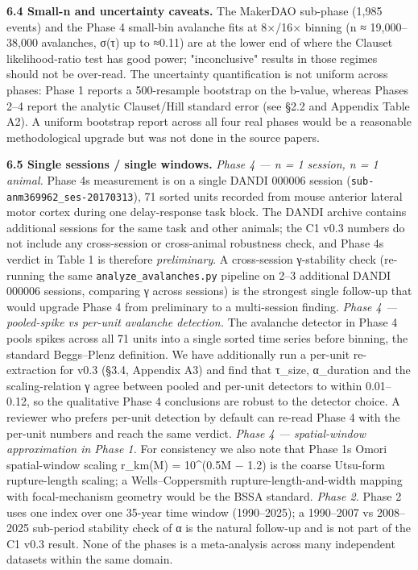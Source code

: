 \documentclass[
  11pt]{article}
\begin{document}
\textbf{6.4 Small-n and uncertainty caveats.} The MakerDAO sub-phase
(1,985 events) and the Phase 4 small-bin avalanche fits at 8×/16×
binning (n ≈ 19,000--38,000 avalanches, σ(τ) up to ≈0.11) are at the
lower end of where the Clauset likelihood-ratio test has good power;
"inconclusive" results in those regimes should not be over-read. The
uncertainty quantification is not uniform across phases: Phase 1 reports
a 500-resample bootstrap on the b-value, whereas Phases 2--4 report the
analytic Clauset/Hill standard error (see §2.2 and Appendix Table A2). A
uniform bootstrap report across all four real phases would be a
reasonable methodological upgrade but was not done in the source papers.

\textbf{6.5 Single sessions / single windows.} \emph{Phase 4 --- n = 1
session, n = 1 animal.} Phase 4\textquotesingle s measurement is on a
single DANDI 000006 session (\texttt{sub-anm369962\_ses-20170313}), 71
sorted units recorded from mouse anterior lateral motor cortex during
one delay-response task block. The DANDI archive contains additional
sessions for the same task and other animals; the C1 v0.3 numbers do not
include any cross-session or cross-animal robustness check, and Phase
4\textquotesingle s verdict in Table 1 is therefore \emph{preliminary}.
A cross-session γ-stability check (re-running the same
\texttt{analyze\_avalanches.py} pipeline on 2--3 additional DANDI 000006
sessions, comparing γ across sessions) is the strongest single follow-up
that would upgrade Phase 4 from preliminary to a multi-session finding.
\emph{Phase 4 --- pooled-spike vs per-unit avalanche detection.} The
avalanche detector in Phase 4 pools spikes across all 71 units into a
single sorted time series before binning, the standard Beggs--Plenz
definition. We have additionally run a per-unit re-extraction for v0.3
(§3.4, Appendix A3) and find that τ\_size, α\_duration and the
scaling-relation γ agree between pooled and per-unit detectors to within
0.01--0.12, so the qualitative Phase 4 conclusions are robust to the
detector choice. A reviewer who prefers per-unit detection by default
can re-read Phase 4 with the per-unit numbers and reach the same
verdict. \emph{Phase 4 --- spatial-window approximation in Phase 1.} For
consistency we also note that Phase 1\textquotesingle s Omori
spatial-window scaling r\_km(M) = 10\^{}(0.5M − 1.2) is the coarse
Utsu-form rupture-length scaling; a Wells--Coppersmith
rupture-length-and-width mapping with focal-mechanism geometry would be
the BSSA standard. \emph{Phase 2.} Phase 2 uses one index over one
35-year time window (1990--2025); a 1990--2007 vs 2008--2025 sub-period
stability check of α is the natural follow-up and is not part of the C1
v0.3 result. None of the phases is a meta-analysis across many
independent datasets within the same domain.
\end{document}

